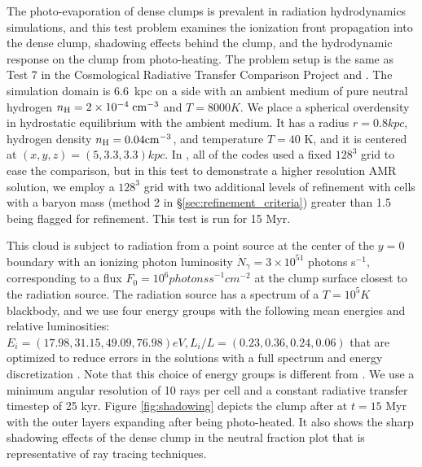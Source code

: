 The photo-evaporation of dense clumps is prevalent in radiation
hydrodynamics simulations, and this test problem examines the
ionization front propagation into the dense clump, shadowing effects
behind the clump, and the hydrodynamic response on the clump from
photo-heating.  The problem setup is the same as Test 7 in the
Cosmological Radiative Transfer Comparison Project
\citep{IlievEtAl2009} and \citet{Wise11_Moray}.  The simulation domain
is 6.6~kpc on a side with an ambient medium of pure neutral hydrogen
$n_{\rm H} = 2 \times 10^{-4}\; \cubecm$ and $T = 8000 \unit{K}$.  We
place a spherical overdensity in hydrostatic equilibrium with the
ambient medium.  It has a radius $r = 0.8 \unit{kpc}$, hydrogen
density $n_{\rm H} = 0.04 \cubecm$, and temperature $T = 40$ K, and it
is centered at $(x,y,z) = (5, 3.3, 3.3) \unit{kpc}$.  In
\citet{IlievEtAl2009}, all of the codes used a fixed $128^3$ grid to
ease the comparison, but in this test to demonstrate a higher
resolution AMR solution, we employ a $128^3$ grid with two additional
levels of refinement with cells with a baryon mass (method 2 in
\S\ref{sec:refinement_criteria}) greater than 1.5 being flagged for
refinement.  This test is run for 15 Myr.

This cloud is subject to radiation from a point source at the center
of the $y=0$ boundary with an ionizing photon luminosity
$\dot{N}_\gamma = 3 \times 10^{51}$ photons s$^{-1}$, corresponding to
a flux $F_0 = 10^6 \unit{photons s}^{-1} \unit{cm}^{-2}$ at the clump
surface closest to the radiation source.  The radiation source has a
spectrum of a $T = 10^5 \unit{K}$ blackbody, and we use four energy
groups with the following mean energies and relative luminosities:
$E_i = (17.98, 31.15, 49.09, 76.98) \unit{eV}, L_i/L = (0.23, 0.36,
0.24, 0.06)$ that are optimized to reduce errors in the solutions with
a full spectrum and energy discretization \citep{Mirocha12}.  Note
that this choice of energy groups is different from
\citet{Wise11_Moray}.  We use a minimum angular resolution of 10 rays
per cell and a constant radiative transfer timestep of 25 kyr.  Figure
\ref{fig:shadowing} depicts the clump after at $t = 15$ Myr with the
outer layers expanding after being photo-heated.  It also shows the
sharp shadowing effects of the dense clump in the neutral fraction
plot that is representative of ray tracing techniques.

